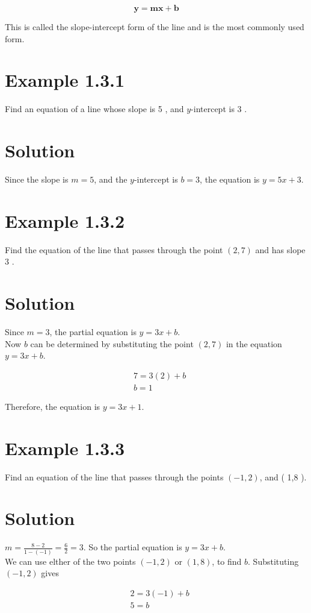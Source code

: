 $$
\mathbf{y}=\mathbf{m x}+\mathbf{b}
$$

This is called the slope-intercept form of the line and is the most commonly used form.

\section*{Example 1.3.1}
Find an equation of a line whose slope is 5 , and $y$-intercept is 3 .

\section*{Solution}
Since the slope is $m=5$, and the $y$-intercept is $b=3$, the equation is $y=5 x+3$.

\section*{Example 1.3.2}
Find the equation of the line that passes through the point $(2,7)$ and has slope 3 .

\section*{Solution}
Since $m=3$, the partial equation is $y=3 x+b$.\\
Now $b$ can be determined by substituting the point $(2,7)$ in the equation $y=3 x+b$.

$$
\begin{aligned}
& 7=3(2)+b \\
& b=1
\end{aligned}
$$

Therefore, the equation is $y=3 x+1$.

\section*{Example 1.3.3}
Find an equation of the line that passes through the points $(-1,2)$, and ( 1,8 ).

\section*{Solution}
$m=\frac{8-2}{1-(-1)}=\frac{6}{2}=3$. So the partial equation is $y=3 x+b$.\\
We can use elther of the two points $(-1,2)$ or $(1,8)$, to find $b$. Substituting $(-1,2)$ gives

$$
\begin{aligned}
& 2=3(-1)+b \\
& 5=b
\end{aligned}
$$

